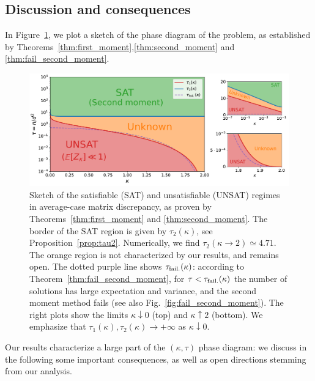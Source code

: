 \subsection{Discussion and consequences}\label{subsec:discussion}

In Figure~\ref{fig:phase_diagram}, we plot a sketch of the phase diagram of the problem, as established by Theorems~\ref{thm:first_moment},\ref{thm:second_moment} and \ref{thm:fail_second_moment}. 
\begin{figure}[!t]
    \centering
    \includegraphics[width=1.0\textwidth]{figures/phase_diagram.pdf}
    \caption{
        Sketch of the satisfiable (SAT) and unsatisfiable (UNSAT) regimes in average-case matrix discrepancy, 
        as proven by Theorems~\ref{thm:first_moment} and \ref{thm:second_moment}. 
        The border of the SAT region is given by $\tau_2(\kappa)$, see Proposition~\ref{prop:tau2}. 
        Numerically, we find $\tau_2(\kappa \to 2) \simeq 4.71$.
        The orange region is not characterized by our results, and remains open.
        The dotted purple line shows $\tau_{\rm fail.}(\kappa)$: according to Theorem~\ref{thm:fail_second_moment}, for $\tau < \tau_{\rm fail.}(\kappa)$ the number of solutions 
        has large expectation and variance, and the second moment method fails (see also Fig.~\ref{fig:fail_second_moment}).
        The right plots show the limits $\kappa \downarrow 0$ (top) and $\kappa \uparrow 2$ (bottom).
        We emphasize that $\tau_1(\kappa), \tau_2(\kappa) \to +\infty$ as $\kappa \downarrow 0$.
    \label{fig:phase_diagram}}
\end{figure}
Our results characterize a large part of the $(\kappa, \tau)$ phase diagram: 
we discuss in the following some important consequences, as well as open directions stemming from our analysis.

